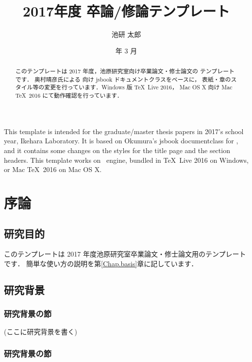\documentclass[dvipdfmx,report,disablejfam,nosetpagesize,12pt]{jsbook}
\title{2017年度 卒論/修論テンプレート}
\author{池研 太郎}
\date{\number\year 年 3 月}
\begin{document}
\frontmatter

\maketitleforcover

\maketitle

\begin{abstract}
このテンプレートは 2017 年度，池原研究室向け卒業論文・修士論文の
テンプレートです．
奥村晴彦氏による \pLaTeXe 向け jsbook ドキュメントクラスをベースに，
表紙・章のスタイル等の変更を行っています．Windows 版 \TeX\ Live 2016，
Mac OS X 向け Mac \TeX\ 2016 にて動作確認を行っています．
\end{abstract}

\begin{eabstract}
This template is intended for the graduate/master thesis papers in 2017's 
school year, Ikehara Laboratory.
It is based on Okumura's jsbook documentclass for \pLaTeXe, and
it contains some changes on the styles for the title page and the section headers.
This template works on \pLaTeX\ engine, bundled in \TeX\ Live 2016 on Windows,
or Mac \TeX\ 2016 on Mac OS X.
\end{eabstract}

\tableofcontents

\mainmatter

\chapter{序論}
\section{研究目的}
このテンプレートは 2017 年度池原研究室卒業論文・修士論文用のテンプレートです．
簡単な使い方の説明を第\ref{Chap.basis}章に記しています．

\section{研究背景}
\subsection{研究背景の節}
(ここに研究背景を書く)
\subsection{研究背景の節}
\end{document}
